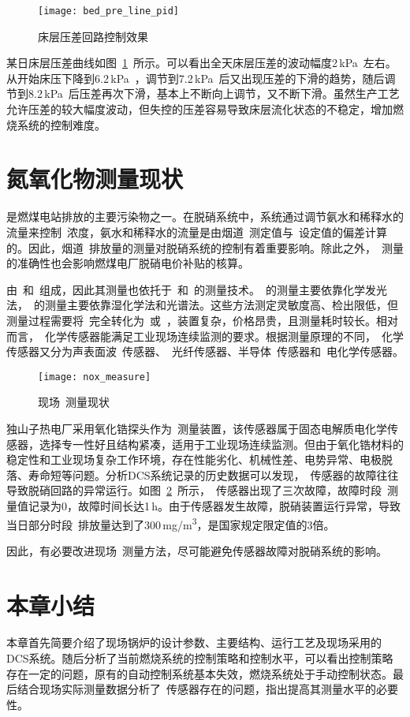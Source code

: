 \begin{figure}[hbtp]
\centering
\texttt{[image: bed\_pre\_line\_pid]}
\caption{床层压差回路控制效果} \label{fig:bed_pre_line_pid}
\end{figure}
 
某日床层压差曲线如图~\ref{fig:bed_pre_line_pid}~所示。可以看出全天床层压差的波动幅度2$\,$\si{\kilo\pascal}~左右。从开始床压下降到6.2$\,$\si{\kilo\pascal}~，调节到7.2$\,$\si{\kilo\pascal}~后又出现压差的下滑的趋势，随后调节到8.2$\,$\si{\kilo\pascal}~后压差再次下滑，基本上不断向上调节，又不断下滑。虽然生产工艺允许压差的较大幅度波动，但失控的压差容易导致床层流化状态的不稳定，增加燃烧系统的控制难度。


\section{氮氧化物测量现状}
\label{sec:nox_measure_now}
是燃煤电站排放的主要污染物之一。在脱硝系统中，系统通过调节氨水和稀释水的流量来控制~浓度，氨水和稀释水的流量是由烟道~测定值与~设定值的偏差计算的。因此，烟道~排放量的测量对脱硝系统的控制有着重要影响。除此之外，~测量的准确性也会影响燃煤电厂脱硝电价补贴的核算。


由~和~组成，因此其测量也依托于~和~的测量技术。~的测量主要依靠化学发光法，~的测量主要依靠湿化学法和光谱法。这些方法测定灵敏度高、检出限低，但测量过程需要将~完全转化为~或~，装置复杂，价格昂贵，且测量耗时较长。相对而言，~化学传感器能满足工业现场连续监测的要求。根据测量原理的不同，~化学传感器又分为声表面波~传感器、~光纤传感器、半导体~传感器和~电化学传感器\cite{王康丽2003氮氧化物化学传感器}。

\begin{figure}[hbtp]
\centering
\texttt{[image: nox\_measure]}
\caption{现场~测量现状} \label{fig:nox_measure}
\end{figure}

独山子热电厂采用氧化锆探头作为~测量装置，该传感器属于固态电解质电化学传感器，选择专一性好且结构紧凑，适用于工业现场连续监测。但由于氧化锆材料的稳定性和工业现场复杂工作环境，存在性能劣化、机械性差、电势异常、电极脱落、寿命短等问题\cite{罗顺安2010氧化锆}。分析DCS系统记录的历史数据可以发现，~传感器的故障往往导致脱硝回路的异常运行。如图~\ref{fig:nox_measure}~所示，~传感器出现了三次故障，故障时段~测量值记录为0，故障时间长达1$\,$\si{\hour}。由于传感器发生故障，脱硝装置运行异常，导致当日部分时段~排放量达到了300$\,$\si[per-mode=symbol]{\mg\per\m^3}，是国家规定限定值的3倍。


 
因此，有必要改进现场~测量方法，尽可能避免传感器故障对脱硝系统的影响。

\section{本章小结}
本章首先简要介绍了现场锅炉的设计参数、主要结构、运行工艺及现场采用的DCS系统。随后分析了当前燃烧系统的控制策略和控制水平，可以看出控制策略存在一定的问题，原有的自动控制系统基本失效，燃烧系统处于手动控制状态。最后结合现场实际测量数据分析了~传感器存在的问题，指出提高其测量水平的必要性。